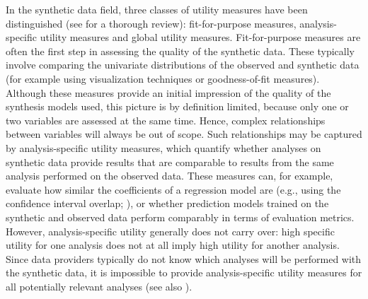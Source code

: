 \documentclass[
]{article}
\begin{document}
In the synthetic data field, three classes of utility measures have been
distinguished (see  for a thorough review): fit-for-purpose measures,
analysis-specific utility measures and global utility measures.
Fit-for-purpose measures are often the first step in assessing the
quality of the synthetic data. These typically involve comparing the
univariate distributions of the observed and synthetic data (for example
using visualization techniques or goodness-of-fit measures). Although
these measures provide an initial impression of the quality of the
synthesis models used, this picture is by definition limited, because
only one or two variables are assessed at the same time. Hence, complex
relationships between variables will always be out of scope. Such
relationships may be captured by analysis-specific utility measures,
which quantify whether analyses on synthetic data provide results that
are comparable to results from the same analysis performed on the
observed data. These measures can, for example, evaluate how similar the
coefficients of a regression model are (e.g., using the confidence
interval overlap; ),
or whether prediction models trained on the synthetic and observed data
perform comparably in terms of evaluation metrics. However,
analysis-specific utility generally does not carry over: high specific
utility for one analysis does not at all imply high utility for another
analysis. Since data providers typically do not know which analyses will
be performed with the synthetic data, it is impossible to provide
analysis-specific utility measures for all potentially relevant analyses
(see also ).
\end{document}
